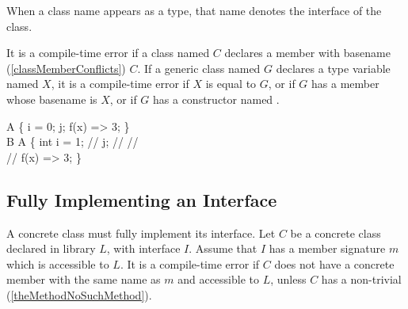 \documentclass[makeidx]{article}
\begin{document}

\LMHash{}%
When a class name appears as a type,
that name denotes the interface of the class.

\LMHash{}%
It is a compile-time error if a class named $C$ declares
a member with basename (\ref{classMemberConflicts}) $C$.
If a generic class named $G$ declares a type variable named $X$,
it is a compile-time error
if $X$ is equal to $G$,
or if $G$ has a member whose basename is $X$,
or if $G$ has a constructor named .


\begin{dartCode}
\CLASS{} A \{
  \VAR{} i = 0;
  \VAR{} j;
  f(x) => 3;
\}
\\
\CLASS{} B \EXTENDS{} A \{
  int i = 1; // 
  \STATIC{} j; // 
  // 
\\
  // 
  \STATIC{} f(x) => 3;
\}
\end{dartCode}


\subsection{Fully Implementing an Interface}


\LMHash{}%
A concrete class must fully implement its interface.
%
Let $C$ be a concrete class declared in library $L$, with interface $I$.
Assume that $I$ has a member signature $m$ which is accessible to $L$.
It is a compile-time error if $C$ does not have
a concrete member with the same name as $m$ and accessible to $L$,
unless $C$ has a non-trivial 
(\ref{theMethodNoSuchMethod}).
\end{document}
